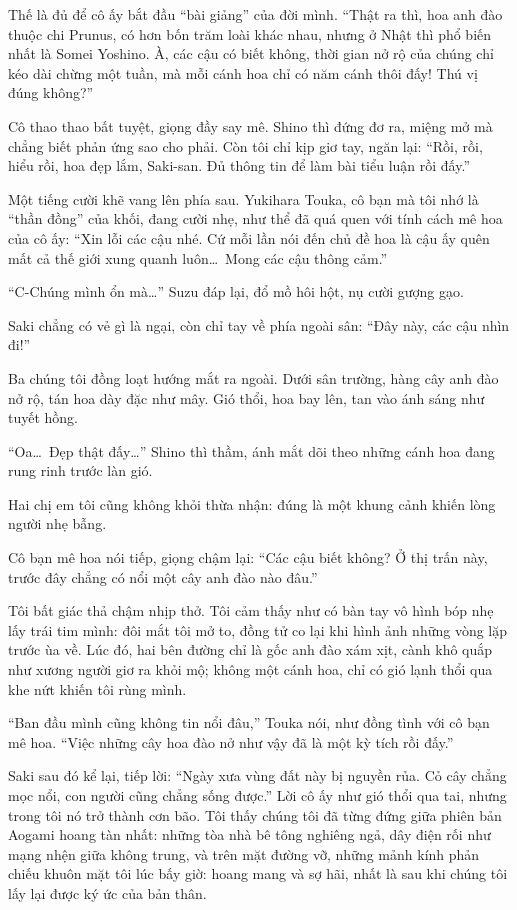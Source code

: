 \documentclass[../main.tex]{subfiles}
\begin{document}
Thế là đủ để cô ấy bắt đầu ``bài giảng'' của đời mình. ``Thật ra thì, hoa anh đào thuộc chi Prunus, có hơn bốn trăm loài khác nhau, nhưng ở Nhật thì phổ biến nhất là Somei Yoshino. À, các cậu có biết không, thời gian nở rộ của chúng chỉ kéo dài chừng một tuần, mà mỗi cánh hoa chỉ có năm cánh thôi đấy! Thú vị đúng không?''

Cô thao thao bất tuyệt, giọng đầy say mê. Shino thì đứng đơ ra, miệng mở mà chẳng biết phản ứng sao cho phải. Còn tôi chỉ kịp giơ tay, ngăn lại: ``Rồi, rồi, hiểu rồi, hoa đẹp lắm, Saki-san. Đủ thông tin để làm bài tiểu luận rồi đấy.''

Một tiếng cười khẽ vang lên phía sau. Yukihara Touka, cô bạn mà tôi nhớ là ``thần đồng'' của khối, đang cười nhẹ, như thể đã quá quen với tính cách mê hoa của cô ấy: ``Xin lỗi các cậu nhé. Cứ mỗi lần nói đến chủ đề hoa là cậu ấy quên mất cả thế giới xung quanh luôn\dots\ Mong các cậu thông cảm.''


``C-Chúng mình ổn mà\dots'' Suzu đáp lại, đổ mồ hôi hột, nụ cười gượng gạo.

Saki chẳng có vẻ gì là ngại, còn chỉ tay về phía ngoài sân: ``Đây này, các cậu nhìn đi!''

Ba chúng tôi đồng loạt hướng mắt ra ngoài. Dưới sân trường, hàng cây anh đào nở rộ, tán hoa dày đặc như mây. Gió thổi, hoa bay lên, tan vào ánh sáng như tuyết hồng.

``Oa\dots\ Đẹp thật đấy\dots'' Shino thì thầm, ánh mắt dõi theo những cánh hoa đang rung rinh trước làn gió.

Hai chị em tôi cũng không khỏi thừa nhận: đúng là một khung cảnh khiến lòng người nhẹ bẫng.

Cô bạn mê hoa nói tiếp, giọng chậm lại: ``Các cậu biết không? Ở thị trấn này, trước đây chẳng có nổi một cây anh đào nào đâu.''

Tôi bất giác thả chậm nhịp thở. Tôi cảm thấy như có bàn tay vô hình bóp nhẹ lấy trái tim mình: đôi mắt tôi mở to, đồng tử co lại khi hình ảnh những vòng lặp trước ùa về. Lúc đó, hai bên đường chỉ là gốc anh đào xám xịt, cành khô quắp như xương người giơ ra khỏi mộ; không một cánh hoa, chỉ có gió lạnh thổi qua khe nứt khiến tôi rùng mình.

``Ban đầu mình cũng không tin nổi đâu,'' Touka nói, như đồng tình với cô bạn mê hoa. ``Việc những cây hoa đào nở như vậy đã là một kỳ tích rồi đấy.''

Saki sau đó kể lại, tiếp lời: ``Ngày xưa vùng đất này bị nguyền rủa. Cỏ cây chẳng mọc nổi, con người cũng chẳng sống được.'' Lời cô ấy như gió thổi qua tai, nhưng trong tôi nó trở thành cơn bão. Tôi thấy chúng tôi đã từng đứng giữa phiên bản Aogami hoang tàn nhất: những tòa nhà bê tông nghiêng ngả, dây điện rối như mạng nhện giữa không trung, và trên mặt đường vỡ, những mảnh kính phản chiếu khuôn mặt tôi lúc bấy giờ: hoang mang và sợ hãi, nhất là sau khi chúng tôi lấy lại được ký ức của bản thân.
\end{document}

